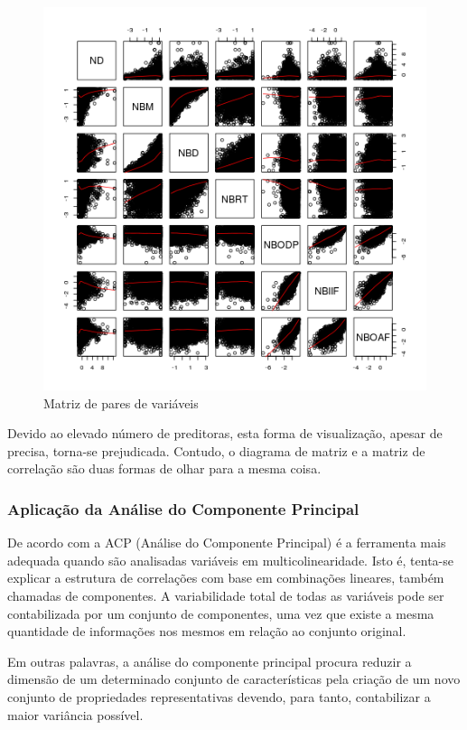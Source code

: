 \begin{figure}[H]
		\centering
		\includegraphics[scale=.80]{../../graficos/latex-graph-pairs.png}
		\caption{Matriz de pares de variáveis}
		\label{fig: scatter-plot}
\end{figure}

Devido ao elevado número de preditoras, esta forma de visualização, apesar de precisa, torna-se prejudicada. Contudo, o diagrama de matriz e a matriz de correlação são duas formas de olhar para a mesma coisa. \cite[p.~98]{larose2015data}

\subsubsection{Aplicação da Análise do Componente Principal}

De acordo com  a ACP (Análise do Componente Principal) é a ferramenta mais adequada quando são analisadas variáveis em multicolinearidade. Isto é, tenta-se explicar a estrutura de correlações com base em combinações lineares, também chamadas de componentes. A variabilidade total de todas as variáveis pode ser contabilizada por um conjunto de componentes, uma vez que existe a mesma quantidade de informações nos mesmos em relação ao conjunto original.

Em outras palavras, a análise do componente principal procura reduzir a dimensão de um determinado conjunto de características pela criação de um novo conjunto de propriedades representativas devendo, para tanto, contabilizar a maior variância possível.

